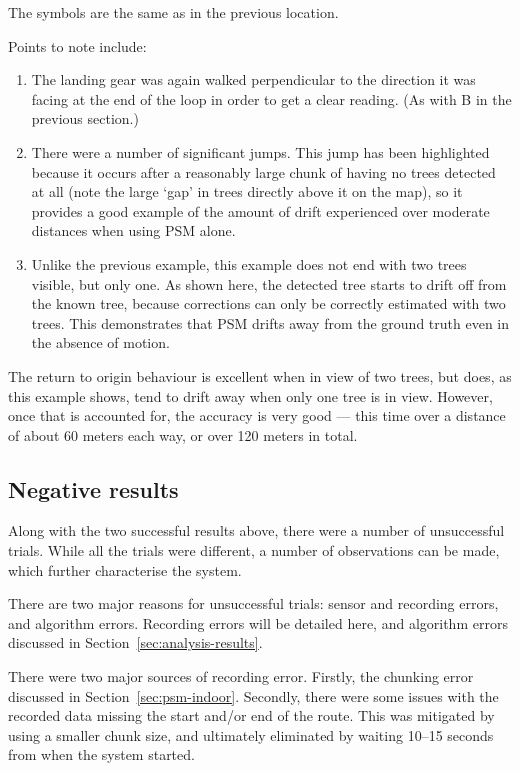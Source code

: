 \documentclass[12pt,oneside,a4paper]{book}
\begin{document}
The symbols are the same as in the previous location.

Points to note include:
\begin{enumerate}[A:]
\item The landing gear was again walked perpendicular to the direction
  it was facing at the end of the loop in order to get a clear
  reading. (As with B in the previous section.)
\item There were a number of significant jumps. This jump has been
  highlighted because it occurs after a reasonably large chunk of
  having no trees detected at all (note the large `gap' in trees
  directly above it on the map), so it provides a good example of the
  amount of drift experienced over moderate distances when using PSM
  alone.
\item Unlike the previous example, this example does not end with two
  trees visible, but only one. As shown here, the detected tree starts
  to drift off from the known tree, because corrections can only be
  correctly estimated with two trees. This demonstrates that PSM
  drifts away from the ground truth even in the absence of motion.
\end{enumerate}

The return to origin behaviour is excellent when in view of two trees,
but does, as this example shows, tend to drift away when only one tree
is in view. However, once that is accounted for, the accuracy is very
good --- this time over a distance of about 60 meters each way, or
over 120 meters in total.

\subsection{Negative results}
\label{sec:negative-results}

Along with the two successful results above, there were a number of
unsuccessful trials. While all the trials were different, a number of
observations can be made, which further characterise the system.

There are two major reasons for unsuccessful trials: sensor and
recording errors, and algorithm errors. Recording errors will be
detailed here, and algorithm errors discussed in
Section~\ref{sec:analysis-results}.

There were two major sources of recording error. Firstly, the chunking
error discussed in Section~\ref{sec:psm-indoor}. Secondly, there were some
issues with the recorded data missing the start and/or end of the
route. This was mitigated by using a smaller chunk size, and
ultimately eliminated by waiting 10--15 seconds from when the system
started.
\end{document}
